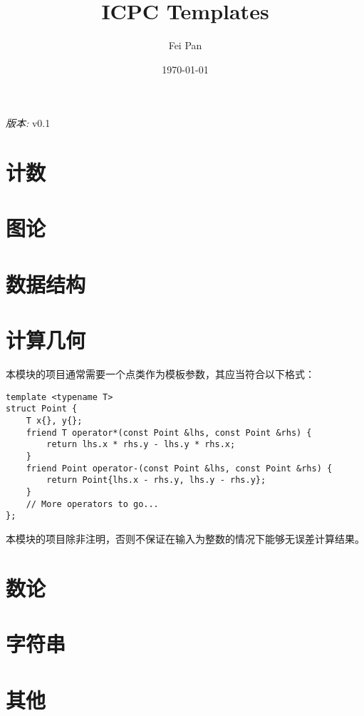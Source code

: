 \documentclass[12pt]{ctexart}
\title{ICPC Templates}
\date{\today}
\author{Fei Pan}
\newcommand{\version}{v0.1}
\begin{document}
\maketitle
\thispagestyle{empty}
\begin{center}
    \textit{版本: }\version
\end{center}

\tableofcontents
\newpage



\section{计数}



\section{图论}









\section{数据结构}



\section{计算几何}

本模块的项目通常需要一个点类作为模板参数，其应当符合以下格式：

\begin{lstlisting}
template <typename T>
struct Point {
    T x{}, y{};
    friend T operator*(const Point &lhs, const Point &rhs) {
        return lhs.x * rhs.y - lhs.y * rhs.x;
    }
    friend Point operator-(const Point &lhs, const Point &rhs) {
        return Point{lhs.x - rhs.y, lhs.y - rhs.y};
    }
    // More operators to go...
};
\end{lstlisting}

本模块的项目除非注明，否则不保证在输入为整数的情况下能够无误差计算结果。






\section{数论}




\section{字符串}




\section{其他}



\end{document}
